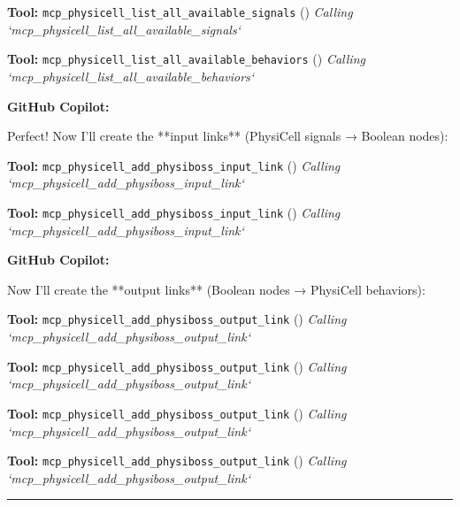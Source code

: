 \documentclass[11pt,a4paper]{article}
\begin{document}
\begin{toolokbox}
\textbf{Tool:} \texttt{mcp\_physicell\_list\_all\_available\_signals} (\checkmark)
\textit{Calling `mcp\_physicell\_list\_all\_available\_signals`}
\end{toolokbox}
\begin{toolokbox}
\textbf{Tool:} \texttt{mcp\_physicell\_list\_all\_available\_behaviors} (\checkmark)
\textit{Calling `mcp\_physicell\_list\_all\_available\_behaviors`}
\end{toolokbox}
\begin{copilotbox}
\textbf{GitHub Copilot:}

Perfect! Now I'll create the **input links** (PhysiCell signals → Boolean nodes):

\end{copilotbox}
\begin{toolokbox}
\textbf{Tool:} \texttt{mcp\_physicell\_add\_physiboss\_input\_link} (\checkmark)
\textit{Calling `mcp\_physicell\_add\_physiboss\_input\_link`}
\end{toolokbox}
\begin{toolokbox}
\textbf{Tool:} \texttt{mcp\_physicell\_add\_physiboss\_input\_link} (\checkmark)
\textit{Calling `mcp\_physicell\_add\_physiboss\_input\_link`}
\end{toolokbox}
\begin{copilotbox}
\textbf{GitHub Copilot:}

Now I'll create the **output links** (Boolean nodes → PhysiCell behaviors):

\end{copilotbox}
\begin{toolokbox}
\textbf{Tool:} \texttt{mcp\_physicell\_add\_physiboss\_output\_link} (\checkmark)
\textit{Calling `mcp\_physicell\_add\_physiboss\_output\_link`}
\end{toolokbox}
\begin{toolokbox}
\textbf{Tool:} \texttt{mcp\_physicell\_add\_physiboss\_output\_link} (\checkmark)
\textit{Calling `mcp\_physicell\_add\_physiboss\_output\_link`}
\end{toolokbox}
\begin{toolokbox}
\textbf{Tool:} \texttt{mcp\_physicell\_add\_physiboss\_output\_link} (\checkmark)
\textit{Calling `mcp\_physicell\_add\_physiboss\_output\_link`}
\end{toolokbox}
\begin{toolokbox}
\textbf{Tool:} \texttt{mcp\_physicell\_add\_physiboss\_output\_link} (\checkmark)
\textit{Calling `mcp\_physicell\_add\_physiboss\_output\_link`}
\end{toolokbox}
\bigskip\hrule\bigskip
\end{document}
